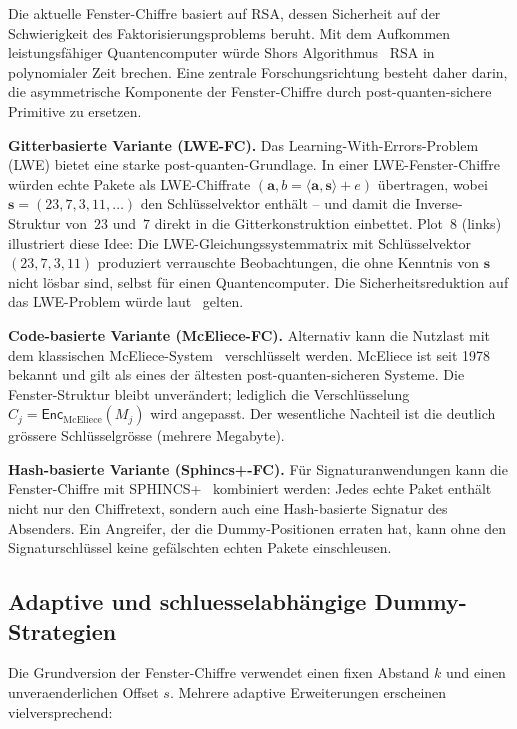 ﻿\documentclass[12pt, a4paper]{article}
\theoremstyle{plain}
\theoremstyle{definition}
\theoremstyle{remark}
\newcommand{\Enc}{\mathsf{Enc}}
\begin{document}
Die aktuelle Fenster-Chiffre basiert auf RSA, dessen Sicherheit auf der
Schwierigkeit des Faktorisierungsproblems beruht. Mit dem Aufkommen
leistungsf\"ahiger Quantencomputer w\"urde Shors Algorithmus~\cite{shor1994algorithms}
RSA in polynomialer Zeit brechen. Eine zentrale Forschungsrichtung besteht
daher darin, die asymmetrische Komponente der Fenster-Chiffre durch
post-quanten-sichere Primitive zu ersetzen.

\textbf{Gitterbasierte Variante (LWE-FC).}
Das Learning-With-Errors-Problem (LWE) \cite{regev2009lattices} bietet
eine starke post-quanten-Grundlage. In einer LWE-Fenster-Chiffre
w\"urden echte Pakete als LWE-Chiffrate $(\mathbf{a}, b = \langle\mathbf{a},\mathbf{s}\rangle + e)$
\"ubertragen, wobei $\mathbf{s} = (23, 7, 3, 11, \ldots)$ den
Schl\"usselvektor enth\"alt -- und damit die Inverse-Struktur von~$23$
und~$7$ direkt in die Gitterkonstruktion einbettet. Plot~8 (links)
illustriert diese Idee: Die LWE-Gleichungssystemmatrix mit Schl\"usselvektor
$(23, 7, 3, 11)$ produziert verrauschte Beobachtungen, die ohne Kenntnis
von $\mathbf{s}$ nicht l\"osbar sind, selbst f\"ur einen Quantencomputer.
Die Sicherheitsreduktion auf das LWE-Problem w\"urde
laut~\cite{peikert2009public} gelten.

\textbf{Code-basierte Variante (McEliece-FC).}
Alternativ kann die Nutzlast mit dem klassischen McEliece-System~\cite{mceliece1978public}
verschl\"usselt werden. McEliece ist seit 1978 bekannt und gilt als
eines der \"altesten post-quanten-sicheren Systeme. Die Fenster-Struktur
bleibt unver\"andert; lediglich die Verschl\"usselung $C_j = \Enc_{\text{McEliece}}(M_j)$
wird angepasst. Der wesentliche Nachteil ist die deutlich gr\"ossere
Schl\"usselgr\"osse (mehrere Megabyte).

\textbf{Hash-basierte Variante (Sphincs+-FC).}
F\"ur Signaturanwendungen kann die Fenster-Chiffre mit SPHINCS+~\cite{bernstein2019sphincs}
kombiniert werden: Jedes echte Paket enth\"alt nicht nur den Chiffretext,
sondern auch eine Hash-basierte Signatur des Absenders. Ein Angreifer,
der die Dummy-Positionen erraten hat, kann ohne den Signaturschl\"ussel
keine gef\"alschten echten Pakete einschleusen.

\subsection{Adaptive und schluesselabh\"angige Dummy-Strategien}

Die Grundversion der Fenster-Chiffre verwendet einen fixen Abstand $k$
und einen unveraenderlichen Offset $s$. Mehrere adaptive Erweiterungen
erscheinen vielversprechend:
\end{document}
